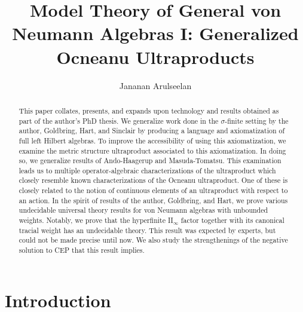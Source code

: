\documentclass[12pt]{amsart}
\theoremstyle{definition}
\begin{document}

\title[Generalized Ocneanu Ultraproducts]{Model Theory of General von Neumann Algebras I: Generalized Ocneanu Ultraproducts}

\author{Jananan Arulseelan}
\address{Department of Mathematics, Iowa State University, 396 Carver Hall, 411 Morrill Road, Ames, IA 50011, USA}



\begin{abstract}
This paper collates, presents, and expands upon technology and results obtained as part of the author's PhD thesis.  We generalize work done in the $\sigma$-finite setting by the author, Goldbring, Hart, and Sinclair by producing a language and axiomatization of full left Hilbert algebras.  To improve the accessibility of using this axiomatization, we examine the metric structure ultraproduct associated to this axiomatization. In doing so, we generalize results of Ando-Haagerup and Masuda-Tomatsu.  This examination leads us to multiple operator-algebraic characterizations of the ultraproduct which closely resemble known characterizations of the Ocneanu ultraproduct.  One of these is closely related to the notion of continuous elements of an ultraproduct with respect to an action.  In the spirit of results of the author, Goldbring, and Hart, we prove various undecidable universal theory results for von Neumann algebras with unbounded weights.  Notably, we prove that the hyperfinite II$_\infty$ factor together with its canonical tracial weight has an undecidable theory.  This result was expected by experts, but could not be made precise until now.  We also study the strengthenings of the negative solution to CEP that this result implies.
\end{abstract}

\maketitle

\tableofcontents

\section{Introduction}\label{SectionIntro}
\end{document}
